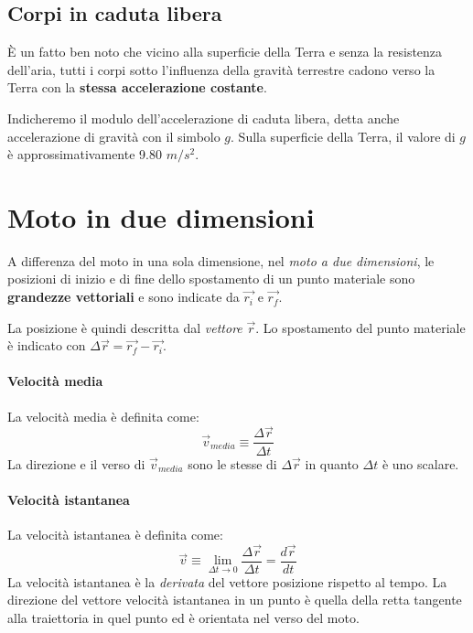 \documentclass[a4paper,11pt,oneside]{book}
\begin{document}
\subsection{Corpi in caduta libera}
È un fatto ben noto che vicino alla superficie della Terra e senza la resistenza dell’aria,
tutti i corpi sotto l’influenza della gravità terrestre cadono verso la Terra con la \textbf{stessa accelerazione costante}.

Indicheremo il modulo dell’accelerazione di caduta libera, detta anche accelerazione di gravità con il simbolo $g$.
Sulla superficie della Terra, il valore di $g$ è approssimativamente 9.80 $m/s^2$.

\section{Moto in due dimensioni}
A differenza del moto in una sola dimensione, nel \emph{moto a due dimensioni}, le posizioni di inizio e di fine dello spostamento
di un punto materiale sono \textbf{grandezze vettoriali} e sono indicate da $\vec{r_i}$ e $\vec{r_f}$.

La posizione è quindi descritta dal \emph{vettore} $\vec{r}$. Lo spostamento del punto materiale è indicato con $\Delta \vec{r} = \vec{r_f}-\vec{r_i}$.

\paragraph{Velocità media}
La velocità media è definita come:
\begin{equation*}
    \vec{v}_{media} \equiv \frac{\Delta \vec{r}}{\Delta t}
\end{equation*}
La direzione e il verso di $\vec{v}_{media}$ sono le stesse di $\Delta \vec{r}$ in quanto $\Delta t$ è uno scalare.

\paragraph{Velocità istantanea}
La velocità istantanea è definita come:
\begin{equation*}
    \vec{v} \equiv \lim_{\Delta t \to 0} \frac{\Delta \vec{r}}{\Delta t} = \frac{d \vec{r}}{dt}
\end{equation*}
La velocità istantanea è la \emph{derivata} del vettore posizione rispetto al
tempo. La direzione del vettore velocità istantanea in un punto è quella della retta tangente alla traiettoria in quel punto ed è orientata nel verso del moto.
\end{document}
